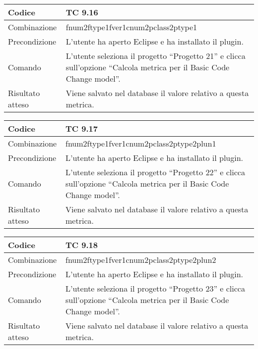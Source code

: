 \begin{table}[ht]
\begin{tabular}{|p{3cm}|p{9cm}|}
\hline
\cellcolor{lightgray}Codice				& TC 9.16								\\
\hline
\cellcolor{lightgray}Combinazione		& fnum2ftype1fver1cnum2pclass2ptype1									\\
\hline
\cellcolor{lightgray}Precondizione		& L'utente ha aperto Eclipse e ha installato il plugin.		\\
\hline
\cellcolor{lightgray}Comando			& L'utente seleziona il progetto ``Progetto 21''  e clicca sull'opzione ``Calcola metrica per il Basic Code Change model''.	\\
\hline
\cellcolor{lightgray}Risultato atteso	& Viene salvato nel database il valore relativo a questa metrica.\\
\hline
\end{tabular}
\end{table}

\begin{table}[ht]
\begin{tabular}{|p{3cm}|p{9cm}|}
\hline
\cellcolor{lightgray}Codice				& TC 9.17								\\
\hline
\cellcolor{lightgray}Combinazione		& fnum2ftype1fver1cnum2pclass2ptype2plun1									\\
\hline
\cellcolor{lightgray}Precondizione		& L'utente ha aperto Eclipse e ha installato il plugin.		\\
\hline
\cellcolor{lightgray}Comando			& L'utente seleziona il progetto ``Progetto 22''  e clicca sull'opzione ``Calcola metrica per il Basic Code Change model''.	\\
\hline
\cellcolor{lightgray}Risultato atteso	& Viene salvato nel database il valore relativo a questa metrica.\\
\hline
\end{tabular}
\end{table}

\begin{table}[ht]
\begin{tabular}{|p{3cm}|p{9cm}|}
\hline
\cellcolor{lightgray}Codice				& TC 9.18								\\
\hline
\cellcolor{lightgray}Combinazione		& fnum2ftype1fver1cnum2pclass2ptype2plun2									\\
\hline
\cellcolor{lightgray}Precondizione		& L'utente ha aperto Eclipse e ha installato il plugin.		\\
\hline
\cellcolor{lightgray}Comando			& L'utente seleziona il progetto ``Progetto 23''  e clicca sull'opzione ``Calcola metrica per il Basic Code Change model''.	\\
\hline
\cellcolor{lightgray}Risultato atteso	& Viene salvato nel database il valore relativo a questa metrica.\\
\hline
\end{tabular}
\end{table}

